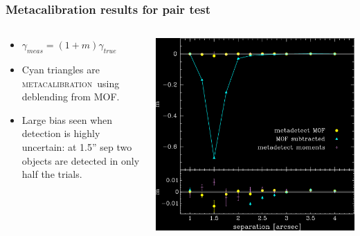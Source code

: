 \documentclass{beamer}
\newcommand{\mcal}{\textsc{metacalibration}}
\begin{document}
\begin{frame}
    \frametitle{Metacalibration results for pair test}

 
    \begin{columns}
        \begin{column}{0.4\textwidth}
            \begin{itemize}

                \item {\color{gold} $\gamma_{meas} = (1+m) \gamma_{true}$}

                \item Cyan triangles are \mcal\ using deblending from MOF.

                \item Large bias seen when detection is highly uncertain: at 1.5'' sep
                    two objects are detected in only half the trials.

            \end{itemize}
        \end{column}
        \begin{column}{0.6\textwidth}
            \begin{center}
                \includegraphics[width=\columnwidth]{pairs-mc-bdkpair-negate.png}
            \end{center}
        \end{column}
    \end{columns}
\end{frame}
\end{document}
